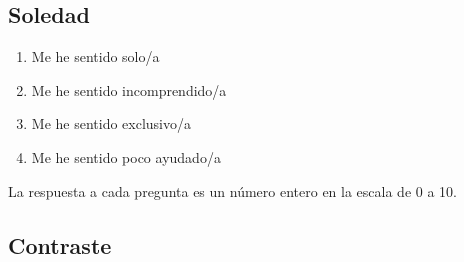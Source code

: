         \subsection{Soledad}
            \begin{enumerate}
                \item Me he sentido solo/a
                \item Me he sentido incomprendido/a
                \item Me he sentido exclusivo/a
                \item Me he sentido poco ayudado/a
            \end{enumerate}
            La respuesta a cada pregunta es un número entero en la escala de 0 a 10.

        \subsection{Contraste}
